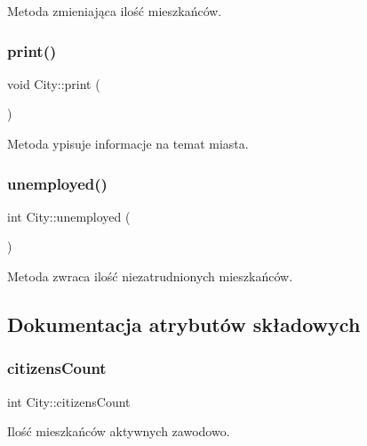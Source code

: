 Metoda zmieniająca ilość mieszkańców. 

\mbox{\label{struct_city_ac656c752d19f2dff77197b6dd43f7900}} 
\subsubsection{\texorpdfstring{print()}{print()}}
{\footnotesize\ttfamily void City\+::print (\begin{DoxyParamCaption}{ }\end{DoxyParamCaption})}



Metoda ypisuje informacje na temat miasta. 

\mbox{\label{struct_city_a1ea5842fbfa8225a02aea0ff4f8497fc}} 
\subsubsection{\texorpdfstring{unemployed()}{unemployed()}}
{\footnotesize\ttfamily int City\+::unemployed (\begin{DoxyParamCaption}{ }\end{DoxyParamCaption})}



Metoda zwraca ilość niezatrudnionych mieszkańców. 



\subsection{Dokumentacja atrybutów składowych}
\mbox{\label{struct_city_ac801edc1fa726efe7fe245570e6b008c}} 
\subsubsection{\texorpdfstring{citizensCount}{citizensCount}}
{\footnotesize\ttfamily int City\+::citizens\+Count}



Ilość mieszkańców aktywnych zawodowo. 

\mbox{\label{struct_city_afea8cd8800a8600fa54af37ac05bf177}} 

